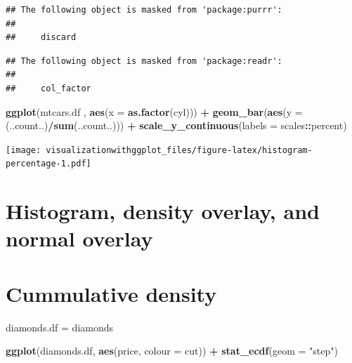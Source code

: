 \documentclass[]{krantz}
\makeatletter
\newenvironment{Shaded}{\begin{snugshade}}{\end{snugshade}}
\newcommand{\DataTypeTok}[1]{\textcolor[rgb]{0.13,0.29,0.53}{#1}}
\newcommand{\KeywordTok}[1]{\textcolor[rgb]{0.13,0.29,0.53}{\textbf{#1}}}
\newcommand{\NormalTok}[1]{#1}
\newcommand{\OperatorTok}[1]{\textcolor[rgb]{0.81,0.36,0.00}{\textbf{#1}}}
\newcommand{\StringTok}[1]{\textcolor[rgb]{0.31,0.60,0.02}{#1}}
\newenvironment{kframe}{%
\medskip{}
\setlength{\fboxsep}{.8em}
 \def\at@end@of@kframe{}%
 \ifinner\ifhmode%
  \def\at@end@of@kframe{\end{minipage}}%
  \begin{minipage}{\columnwidth}%
 \fi\fi%
 \def\FrameCommand##1{\hskip\@totalleftmargin \hskip-\fboxsep
 \colorbox{shadecolor}{##1}\hskip-\fboxsep
     \hskip-\linewidth \hskip-\@totalleftmargin \hskip\columnwidth}%
 \MakeFramed {\advance\hsize-\width
   \@totalleftmargin\z@ \linewidth\hsize
   \@setminipage}}%
 {\par\unskip\endMakeFramed%
 \at@end@of@kframe}
\renewenvironment{Shaded}{\begin{kframe}}{\end{kframe}}
\makeatother
\begin{document}
\begin{verbatim}
## The following object is masked from 'package:purrr':
## 
##     discard
\end{verbatim}

\begin{verbatim}
## The following object is masked from 'package:readr':
## 
##     col_factor
\end{verbatim}

\begin{Shaded}
\begin{Highlighting}[]
\KeywordTok{ggplot}\NormalTok{(mtcars.df , }\KeywordTok{aes}\NormalTok{(}\DataTypeTok{x =} \KeywordTok{as.factor}\NormalTok{(cyl))) }\OperatorTok{+}\StringTok{ }
\StringTok{    }\KeywordTok{geom_bar}\NormalTok{(}\KeywordTok{aes}\NormalTok{(}\DataTypeTok{y =}\NormalTok{ (..count..)}\OperatorTok{/}\KeywordTok{sum}\NormalTok{(..count..))) }\OperatorTok{+}\StringTok{ }
\StringTok{    }\KeywordTok{scale_y_continuous}\NormalTok{(}\DataTypeTok{labels =}\NormalTok{ scales}\OperatorTok{::}\NormalTok{percent)}
\end{Highlighting}
\end{Shaded}

\texttt{[image: visualizationwithggplot\_files/figure-latex/histogram-percentage-1.pdf]}

\hypertarget{histogram-density-overlay-and-normal-overlay}{%
\section{Histogram, density overlay, and normal overlay}\label{histogram-density-overlay-and-normal-overlay}}

\hypertarget{cummulative-density}{%
\section{Cummulative density}\label{cummulative-density}}

\begin{Shaded}
\begin{Highlighting}[]
\NormalTok{diamonds.df =}\StringTok{ }\NormalTok{diamonds}

\KeywordTok{ggplot}\NormalTok{(diamonds.df, }\KeywordTok{aes}\NormalTok{(price, }\DataTypeTok{colour =}\NormalTok{ cut)) }\OperatorTok{+}\StringTok{ }
\StringTok{  }\KeywordTok{stat_ecdf}\NormalTok{(}\DataTypeTok{geom =} \StringTok{"step"}\NormalTok{)}
\end{Highlighting}
\end{Shaded}
\end{document}
